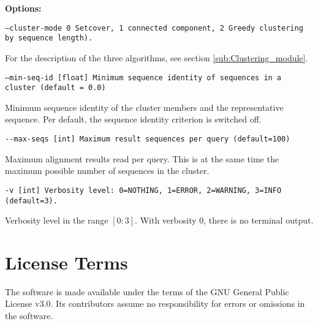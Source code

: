 \documentclass[11pt,a4paper]{scrreprt}
\begin{document}
\textbf{Options:}


\texttt{\small --cluster-mode 0 Setcover, 1 connected component, 2 Greedy clustering by sequence length).}{\small \par}


For the description of the three algorithms, see section \ref{sub:Clustering_module}.


\texttt{\small --min-seq-id {[}float{]} Minimum sequence identity of sequences in a cluster (default = 0.0)}{\small \par}


Minimum sequence identity of the cluster members and the representative sequence. Per default, the sequence identity criterion is switched off.


\texttt{\small -{}-max-seqs {[}int{]} Maximum result sequences per query (default=100)}{\small \par}


Maximum alignment results read per query. This is at the same time the maximum possible number of sequences in the cluster.


\texttt{\small -v {[}int{]} Verbosity level: 0=NOTHING, 1=ERROR, 2=WARNING, 3=INFO (default=3).}{\small \par}


Verbosity level in the range $[0:3]$. With verbosity $0$, there is no terminal output.




\section{License Terms}
The software is made available under the terms of the GNU General Public License v3.0. Its contributors assume no responsibility for errors or omissions in the software.
\end{document}
